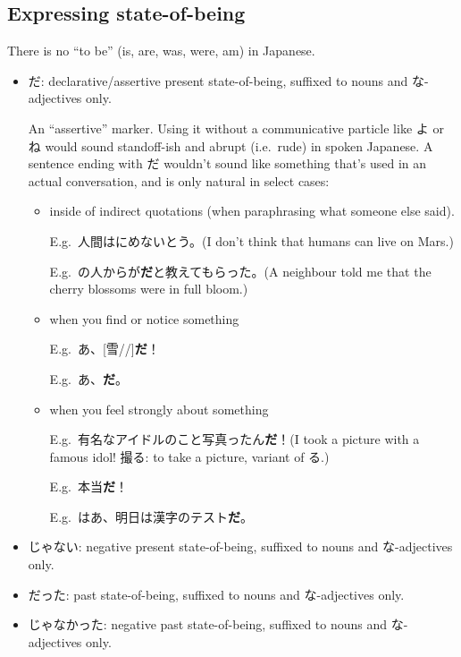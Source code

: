 \documentclass[../nihongo-gakushuu-kyouzai.tex]{subfiles}
\begin{document}
\subsection{Expressing state-of-being} \label{sec:expressing-state-of-being}
There is no ``to be'' (is, are, was, were, am) in Japanese.
\begin{itemize}
    \item だ: declarative/assertive present state-of-being, suffixed to nouns and な-adjectives only.

    An ``assertive'' marker. Using it without a communicative particle like よ or ね would sound standoff-ish and abrupt (i.e.\ rude) in spoken Japanese. A sentence ending with だ wouldn't sound like something that's used in an actual conversation, and is only natural in select cases:
    \begin{itemize}
        \item inside of indirect quotations (when paraphrasing what someone else said).

        E.g.\ 人間はにめないとう。(I don't think that humans can live on Mars.)

        E.g.\ の人からが\textbf{だ}と教えてもらった。(A neighbour told me that the cherry blossoms were in full bloom.)
        \item when you find or notice something

        E.g.\ あ、[雪//]\textbf{だ}！

        E.g.\ あ、\textbf{だ}。

        \item when you feel strongly about something

        E.g.\ 有名なアイドルのこと写真ったん\textbf{だ}！(I took a picture with a famous idol! 撮る: to take a picture, variant of る.)

        E.g.\ 本当\textbf{だ}！

        E.g.\ はあ、明日は漢字のテスト\textbf{だ}。
    \end{itemize}


    \item じゃない: negative present state-of-being, suffixed to nouns and な-adjectives only.


    \item だった: past state-of-being, suffixed to nouns and な-adjectives only.
    \item じゃなかった: negative past state-of-being, suffixed to nouns and な-adjectives only.

\end{itemize}
\end{document}
